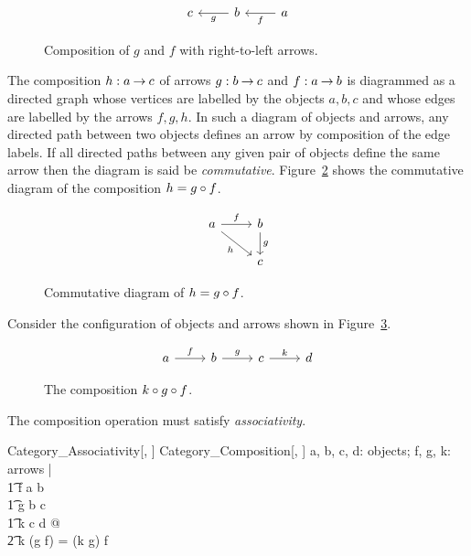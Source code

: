 \documentclass{amsart}
\begin{document}
\begin{figure}[h!]
$$
  \begin{tikzcd}
    c & b \arrow{l}{g} & a \arrow{l}{f}
  \end{tikzcd}
$$
\caption{Composition of $g$ and $f$ with right-to-left arrows.}
\label{fig:g_comp_f_left}
\end{figure}

The composition $h: a \mathbin{\rightarrow} c$ of arrows $g: b \mathbin{\rightarrow} c$ and $f: a \mathbin{\rightarrow} b$ is diagrammed as a directed graph whose 
vertices are labelled by the objects $a, b, c$ and whose edges are labelled by the arrows $f, g, h$.
In such a diagram of objects and arrows, any directed path between two objects defines an arrow by composition of the edge labels.
If all directed paths between any given pair of objects define the same arrow then the diagram is said be \textit{commutative}.
Figure~\ref{fig:cd_h_gf} shows the commutative diagram of the composition $h = g \mathbin{\circ} f$.

\begin{figure}[h!]
$$
  \begin{tikzcd}
    a \arrow{r}{f} \arrow[swap]{dr}{h} & b \arrow{d}{g} \\
     & c
  \end{tikzcd}
$$
\caption{Commutative diagram of $h = g \mathbin{\circ} f$.}
\label{fig:cd_h_gf}
\end{figure}

Consider the configuration of objects and arrows shown in Figure~\ref{fig:fgk}.

\begin{figure}[h!]
$$
\begin{tikzcd}
	a \arrow{r}{f} & b \arrow{r}{g} & c \arrow{r}{k} & d
\end{tikzcd}
$$
\caption{The composition $k \mathbin{\circ} g \mathbin{\circ} f$.}
\label{fig:fgk}
\end{figure}

The composition operation must satisfy \textit{associativity}.
\begin{schema}{Category\_Associativity}[\genO, \genA]
	Category\_Composition[\genO, \genA]
\where
	\forall a, b, c, d: objects; f, g, k: arrows | \\
	\t1	f \in a \arrCat b \land \\
	\t1	g \in b \arrCat c \land \\
	\t1	k \in c \arrCat  d @\\
	\t2		k \compCat (g \compCat f) = (k \compCat g) \compCat f
\end{schema}
\end{document}
